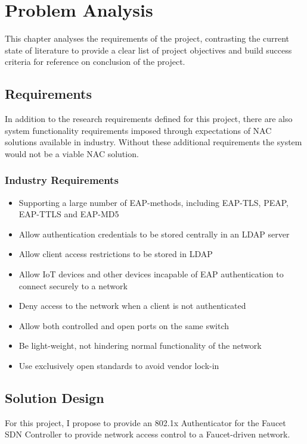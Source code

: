 \chapter{Problem Analysis}\label{chapter:analysis}
This chapter analyses the requirements of the project, contrasting the current state of literature to provide a clear list of project objectives and build success criteria for reference on conclusion of the project.

\section{Requirements}
In addition to the research requirements defined for this project, there are also system functionality requirements imposed through expectations of NAC solutions available in industry. Without these additional requirements the system would not be a viable NAC solution.

\subsection{Industry Requirements}
\begin{itemize}
    \item Supporting a large number of EAP-methods, including EAP-TLS, PEAP, EAP-TTLS and EAP-MD5
    \item Allow authentication credentials to be stored centrally in an LDAP server
    \item Allow client access restrictions to be stored in LDAP
    \item Allow IoT devices and other devices incapable of EAP authentication to connect securely to a network
    \item Deny access to the network when a client is not authenticated
    \item Allow both controlled and open ports on the same switch
    \item Be light-weight, not hindering normal functionality of the network
    \item Use exclusively open standards to avoid vendor lock-in
\end{itemize}

\section{Solution Design}
For this project, I propose to provide an 802.1x Authenticator for the Faucet SDN Controller to provide network access control to a Faucet-driven network. 


